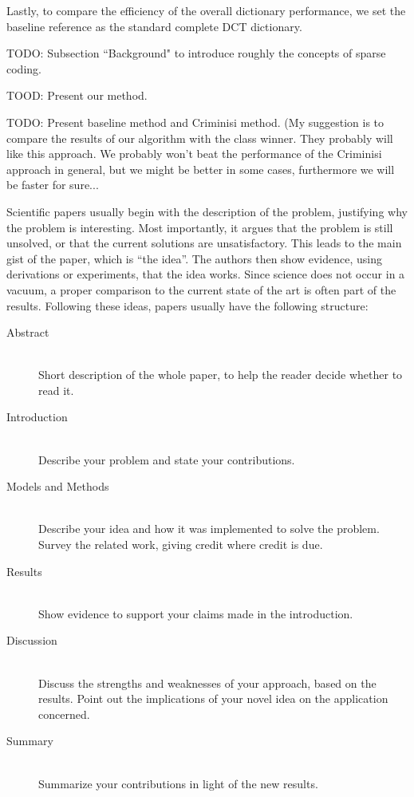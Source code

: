 Lastly, to compare the efficiency of the overall dictionary performance, we set the baseline reference as the standard complete DCT dictionary.

































TODO: Subsection ``Background" to introduce roughly the concepts of sparse coding.

TOOD: Present our method.

TODO: Present baseline method and Criminisi method. (My suggestion is to compare the results of our algorithm with the class winner. They probably will like this approach. We probably won't beat the performance of the Criminisi approach in general, but we might be better in some cases, furthermore we will be faster for sure...

Scientific papers usually begin with the description of the problem,
justifying why the problem is interesting. Most importantly, it argues
that the problem is still unsolved, or that the current solutions are
unsatisfactory. This leads to the main gist of the paper, which is
``the idea''. The authors then show evidence, using derivations or
experiments, that the idea works. Since science does not occur in a
vacuum, a proper comparison to the current state of the art is often
part of the results. Following these ideas, papers usually have the
following structure:
\begin{description}
\item[Abstract] \ \\
  Short description of the whole paper, to help the
  reader decide whether to read it.
\item[Introduction] \ \\
  Describe your problem and state your
  contributions.
\item[Models and Methods] \ \\
  Describe your idea and how it was implemented to solve
  the problem. Survey the related work, giving credit where credit is
  due.
\item[Results] \ \\
  Show evidence to support your claims made in the
  introduction.
\item[Discussion] \ \\
  Discuss the strengths and weaknesses of your
  approach, based on the results. Point out the implications of your
  novel idea on the application concerned.
\item[Summary] \ \\
  Summarize your contributions in light of the new
  results.
\end{description}


